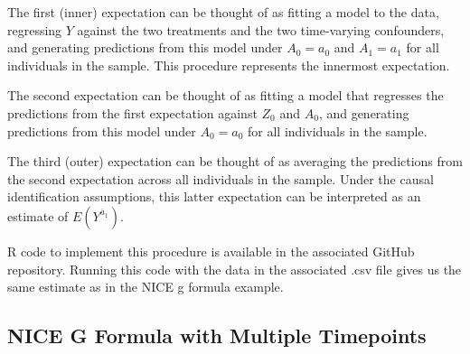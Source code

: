 \documentclass[12pt]{article}
\numberwithin{equation}{section}
\begin{document}
The first (inner) expectation can be thought of as fitting a model to the data, regressing $Y$ against the two treatments and the two time-varying confounders, and generating predictions from this model under $A_0 = a_0$ and $A_1 = a_1$ for all individuals in the sample. This procedure represents the innermost expectation.

The second expectation can be thought of as fitting a model that regresses the predictions from the first expectation against $Z_0$ and $A_0$, and generating predictions from this model under $A_0 = a_0$ for all individuals in the sample.

The third (outer) expectation can be thought of as averaging the predictions from the second expectation across all individuals in the sample. Under the causal identification assumptions, this latter expectation can be interpreted as an estimate of $E(Y^{\overline{a}_1})$.

R code to implement this procedure is available in the associated GitHub repository. Running this code with the data in the associated .csv file gives us the same estimate as in the NICE g formula example.

\subsection{NICE G Formula with Multiple Timepoints}
\end{document}
